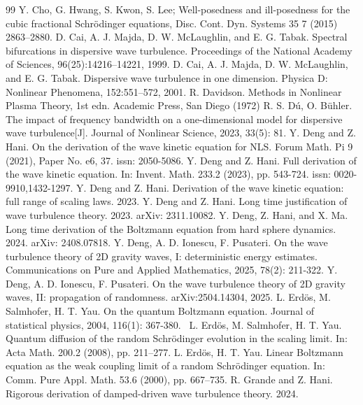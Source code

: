 \documentclass[UTF-8,reqno]{amsart}
\numberwithin{equation}{section}
\theoremstyle{definition}
\begin{document}
\begin{thebibliography}{99}
 Y. Cho, G. Hwang, S. Kwon, S. Lee; Well-posedness and ill-posedness for the cubic fractional Schr\"odinger
equations, Disc. Cont. Dyn. Systems 35 7 (2015) 2863–2880.
 D. Cai, A. J. Majda, D. W. McLaughlin, and E. G. Tabak. Spectral bifurcations in dispersive wave
 turbulence. Proceedings of the National Academy of Sciences, 96(25):14216–14221, 1999.
  D. Cai, A. J. Majda, D. W. McLaughlin, and E. G. Tabak. Dispersive wave turbulence in one dimension.
 Physica D: Nonlinear Phenomena, 152:551–572, 2001.
R. Davidson. Methods in Nonlinear Plasma Theory, 1st edn. Academic Press, San Diego (1972)
 R. S. D\'u, O. B\"uhler. The impact of frequency bandwidth on a one-dimensional model for dispersive wave turbulence[J]. Journal of Nonlinear Science, 2023, 33(5): 81.
 Y. Deng and Z. Hani. On the derivation of the wave kinetic equation for NLS.  Forum Math.  Pi 9 (2021), Paper No. e6, 37. issn: 2050-5086.
 Y. Deng and Z. Hani. Full derivation of the wave kinetic equation. In: Invent. Math. 233.2 (2023), pp. 543-724. issn: 0020-9910,1432-1297. 
 Y. Deng and Z. Hani. Derivation of the wave kinetic equation: full range of scaling laws. 2023. 
  Y. Deng and Z. Hani.  Long time justification of wave turbulence theory. 2023. arXiv: 2311.10082.
 Y. Deng, Z. Hani, and X. Ma. Long time derivation of the Boltzmann equation from hard
 sphere dynamics. 2024. arXiv: 2408.07818.
Y. Deng, A. D. Ionescu, F. Pusateri. On the wave turbulence theory of 2D gravity waves, I: deterministic energy estimates. Communications on Pure and Applied Mathematics, 2025, 78(2): 211-322.
Y. Deng, A. D. Ionescu, F. Pusateri. On the wave turbulence theory of 2D gravity waves, II: propagation of randomness. arXiv:2504.14304, 2025.
L. Erd\"os, M. Salmhofer,  H. T. Yau. On the quantum Boltzmann equation. Journal of statistical physics, 2004, 116(1): 367-380.
\
L. Erd\"os, M. Salmhofer,  H. T. Yau. Quantum diffusion of the random Schr\"odinger
 evolution in the scaling limit. In: Acta Math. 200.2 (2008), pp. 211–277. 
 \bibitem[EY00]{EY00}
 L. Erd\"os,    H. T. Yau. Linear Boltzmann equation as the weak coupling limit of a random
 Schr\"odinger equation. In: Comm. Pure Appl. Math. 53.6 (2000), pp. 667–735. 
 \bibitem[GH24]{GH24}
  R. Grande and Z. Hani. Rigorous derivation of damped-driven wave turbulence theory. 2024.

\end{thebibliography}
\end{document}
